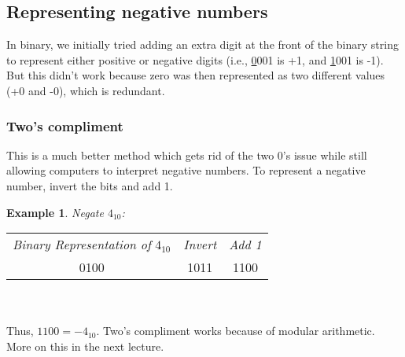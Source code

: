 \documentclass{report}
\newtheorem{ex}{Example}[section]
\begin{document}
\subsection{Representing negative numbers}
In binary, we initially tried adding an extra digit at the front of the binary string to represent either positive or negative digits (i.e., \underline{0}001 is +1, and \underline{1}001 is -1). But this didn't work because zero was then represented as two different values (+0 and -0), which  is redundant.
\subsubsection{Two's compliment}
This is a much better method which gets rid of the two 0's issue while still allowing computers to interpret negative numbers. To represent a negative number, invert the bits and add 1.
\begin{ex}
Negate $4_{10}$:
\end{ex}
\begin{tabular}{ c c c }
\textit{Binary Representation of} $4_{10}$ & \textit{Invert} & \textit{Add 1} \\
0100 & 1011 & 1100
\end{tabular}
\\ \\
Thus, $1100 = -4_{10}$. Two's compliment works because of modular arithmetic. More on this in the next lecture.
\end{document}
